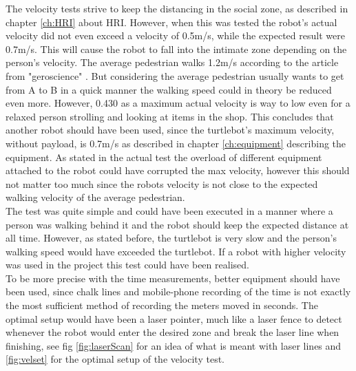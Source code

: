The velocity tests strive to keep the distancing in the social zone, as described in chapter \ref{ch:HRI} about HRI. However, when this was tested the robot's actual velocity did not even exceed a velocity of 0.5m/s, while the expected result were 0.7m/s. This will cause the robot to fall into the intimate zone depending on the person's velocity. The average pedestrian walks 1.2m/s according to the article from "geroscience" \cite{callisaya2017cognitive}. But considering the average pedestrian usually wants to get from A to B in a quick manner the walking speed could in theory be reduced even more. However, 0.430 as a maximum actual velocity is way to low even for a relaxed person strolling and looking at items in the shop. This concludes that another robot should have been used, since the turtlebot's maximum velocity, without payload, is 0.7m/s as described in chapter \ref{ch:equipment} describing the equipment. As stated in the actual test the overload of different equipment attached to the robot could have corrupted the max velocity, however this should not matter too much since the robots velocity is not close to the expected walking velocity of the average pedestrian.\\
The test was quite simple and could have been executed in a manner where a person was walking behind it and the robot should keep the expected distance at all time. However, as stated before, the turtlebot is very slow and the person's walking speed would have exceeded the turtlebot. If a robot with higher velocity was used in the project this test could have been realised.\\
To be more precise with the time measurements, better equipment should have been used, since chalk lines and mobile-phone recording of the time is not exactly the most sufficient method of recording the meters moved in seconds. The optimal setup would have been a laser pointer, much like a laser fence to detect whenever the robot would enter the desired zone and break the laser line when finishing, see fig \ref{fig:laserScan} for an idea of what is meant with laser lines and \ref{fig:velset} for the optimal setup of the velocity test.
